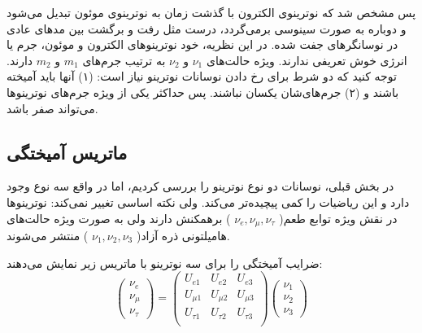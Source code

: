 \documentclass[a4paper,11pt,oneside,openany]{iut-thesis}
\begin{document}
پس مشخص شد که نوترینوی الکترون با گذشت زمان به نوترینوی موئون تبدیل می‌شود و دوباره به صورت سینوسی برمی‌گردد، درست مثل رفت و برگشت بین مدهای عادی در نوسانگرهای جفت شده. در این نظریه، خود نوترینوهای الکترون و موئون، جرم یا انرژی خوش تعریفی ندارند. ویژه حالت‌های $\nu_{1}$ و $\nu_{2}$ به ترتیب جرم‌های $m_{1}$ و $m_{2}$ دارند.
توجه کنید که دو شرط برای رخ دادن نوسانات نوترینو نیاز است: (۱) آنها باید آمیخته باشند و (۲) جرم‌های‌شان یکسان نباشند. پس حداکثر یکی از ویژه جرم‌های نوترینوها می‌تواند صفر باشد.

\subsection{
ماتریس آمیختگی
}
در بخش قبلی، نوسانات دو نوع نوترینو را بررسی کردیم، اما در واقع سه نوع وجود دارد و این ریاضیات را کمی پیچیده‌تر می‌کند. ولی نکته اساسی تغییر نمی‌کند: نوترینوها در نقش ویژه توابع طعم(
$\nu_{e}, \nu_{\mu}, \nu_{\tau}$
) برهمکنش دارند ولی به صورت ویژه حالت‌های هامیلتونی ذره آزاد(
$\nu_{1}, \nu_{2}, \nu_{3}$
) منتشر می‌شوند.

ضرایب آمیختگی را برای سه نوترینو با ماتریس زیر نمایش می‌دهند:
\begin{equation}
\begin{pmatrix}
\nu_{e}    \\
\nu_{\mu}  \\
\nu_{\tau}
\end{pmatrix} = 
\begin{pmatrix}
U_{e1}     & U_{e2}     & U_{e3}     \\
U_{\mu 1}  & U_{\mu 2}  & U_{\mu 3}  \\
U_{\tau 1} & U_{\tau 2} & U_{\tau 3} \\
\end{pmatrix}
\begin{pmatrix}
\nu_{1} \\
\nu_{2} \\
\nu_{3}
\end{pmatrix}
\end{equation}
\end{document}
